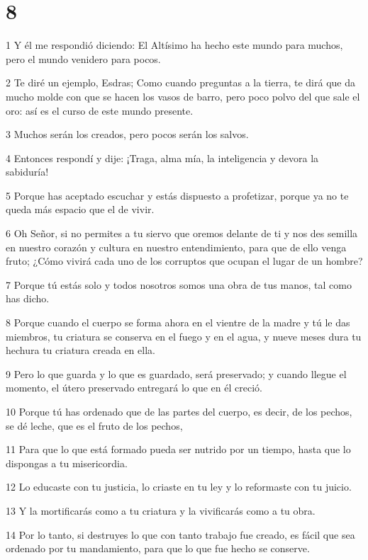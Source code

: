\chapter{8}

\par 1 Y él me respondió diciendo: El Altísimo ha hecho este mundo para muchos, pero el mundo venidero para pocos.
\par 2 Te diré un ejemplo, Esdras; Como cuando preguntas a la tierra, te dirá que da mucho molde con que se hacen los vasos de barro, pero poco polvo del que sale el oro: así es el curso de este mundo presente.
\par 3 Muchos serán los creados, pero pocos serán los salvos.
\par 4 Entonces respondí y dije: ¡Traga, alma mía, la inteligencia y devora la sabiduría!
\par 5 Porque has aceptado escuchar y estás dispuesto a profetizar, porque ya no te queda más espacio que el de vivir.
\par 6 Oh Señor, si no permites a tu siervo que oremos delante de ti y nos des semilla en nuestro corazón y cultura en nuestro entendimiento, para que de ello venga fruto; ¿Cómo vivirá cada uno de los corruptos que ocupan el lugar de un hombre?
\par 7 Porque tú estás solo y todos nosotros somos una obra de tus manos, tal como has dicho.
\par 8 Porque cuando el cuerpo se forma ahora en el vientre de la madre y tú le das miembros, tu criatura se conserva en el fuego y en el agua, y nueve meses dura tu hechura tu criatura creada en ella.
\par 9 Pero lo que guarda y lo que es guardado, será preservado; y cuando llegue el momento, el útero preservado entregará lo que en él creció.
\par 10 Porque tú has ordenado que de las partes del cuerpo, es decir, de los pechos, se dé leche, que es el fruto de los pechos,
\par 11 Para que lo que está formado pueda ser nutrido por un tiempo, hasta que lo dispongas a tu misericordia.
\par 12 Lo educaste con tu justicia, lo criaste en tu ley y lo reformaste con tu juicio.
\par 13 Y la mortificarás como a tu criatura y la vivificarás como a tu obra.
\par 14 Por lo tanto, si destruyes lo que con tanto trabajo fue creado, es fácil que sea ordenado por tu mandamiento, para que lo que fue hecho se conserve.
